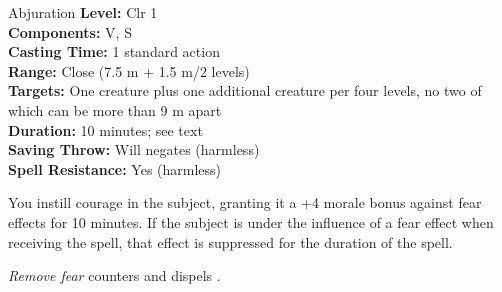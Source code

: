 {Abjuration}
{
	\textbf{Level:}
	Clr 1\\
	\textbf{Components:}
	V, S\\
	\textbf{Casting Time:}
	1 standard action\\
	\textbf{Range:}
	Close (7.5 m + 1.5 m/2 levels)\\
	\textbf{Targets:}
	One creature plus one additional creature per four levels, no two of which can be more than 9 m apart\\
	\textbf{Duration:}
	10 minutes; see text\\
	\textbf{Saving Throw:}
	Will negates (harmless)\\
	\textbf{Spell Resistance:}
	Yes (harmless)\\
}
{
	You instill courage in the subject, granting it a +4 morale bonus against fear effects for 10 minutes. If the subject is under the influence of a fear effect when receiving the spell, that effect is suppressed for the duration of the spell.

	\emph{Remove fear} counters and dispels .

}
